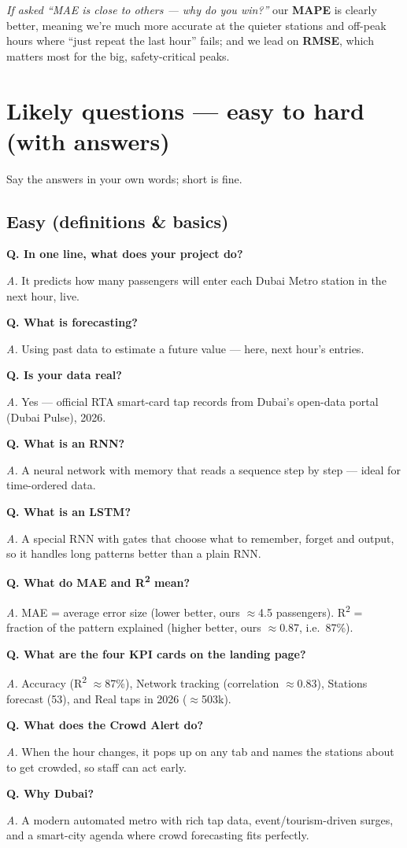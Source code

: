 \documentclass[11pt]{article}
\newcommand{\q}[1]{\medskip\noindent\textbf{Q. #1}\par\nopagebreak}
\newcommand{\an}[1]{\noindent\textit{A.} #1\par}
\begin{document}
\medskip\noindent\textit{If asked ``MAE is close to others --- why do you win?''} our \textbf{MAPE} is
clearly better, meaning we're much more accurate at the quieter stations and off-peak hours where
``just repeat the last hour'' fails; and we lead on \textbf{RMSE}, which matters most for the big,
safety-critical peaks.

\section{Likely questions --- easy to hard (with answers)}
Say the answers in your own words; short is fine.

\subsection{Easy (definitions \& basics)}
\q{In one line, what does your project do?}
\an{It predicts how many passengers will enter each Dubai Metro station in the next hour, live.}
\q{What is forecasting?}
\an{Using past data to estimate a future value --- here, next hour's entries.}
\q{Is your data real?}
\an{Yes --- official RTA smart-card tap records from Dubai's open-data portal (Dubai Pulse), 2026.}
\q{What is an RNN?}
\an{A neural network with memory that reads a sequence step by step --- ideal for time-ordered data.}
\q{What is an LSTM?}
\an{A special RNN with gates that choose what to remember, forget and output, so it handles long
patterns better than a plain RNN.}
\q{What do MAE and R\textsuperscript{2} mean?}
\an{MAE = average error size (lower better, ours $\approx$4.5 passengers). R\textsuperscript{2} =
fraction of the pattern explained (higher better, ours $\approx$0.87, i.e.\ 87\%).}
\q{What are the four KPI cards on the landing page?}
\an{Accuracy (R\textsuperscript{2} $\approx$87\%), Network tracking (correlation $\approx$0.83),
Stations forecast (53), and Real taps in 2026 ($\approx$503k).}
\q{What does the Crowd Alert do?}
\an{When the hour changes, it pops up on any tab and names the stations about to get crowded, so staff
can act early.}
\q{Why Dubai?}
\an{A modern automated metro with rich tap data, event/tourism-driven surges, and a smart-city agenda
where crowd forecasting fits perfectly.}
\end{document}
